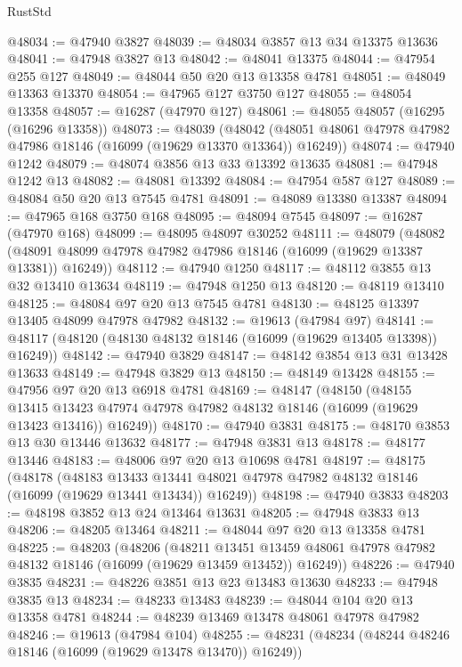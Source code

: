 \begin{lexlean}{RustStd}
\begin{coremodule}
@48034 := @47940 @3827
@48039 := @48034 @3857 @13 @34 @13375 @13636
@48041 := @47948 @3827 @13
@48042 := @48041 @13375
@48044 := @47954 @255 @127
@48049 := @48044 @50 @20 @13 @13358 @4781
@48051 := @48049 @13363 @13370
@48054 := @47965 @127 @3750 @127
@48055 := @48054 @13358
@48057 := @16287 (@47970 @127)
@48061 := @48055 @48057 (@16295 (@16296 @13358))
@48073 := @48039
    (@48042 (@48051 @48061 @47978 @47982 @47986 @18146 (@16099 (@19629 @13370 @13364)) @16249))
@48074 := @47940 @1242
@48079 := @48074 @3856 @13 @33 @13392 @13635
@48081 := @47948 @1242 @13
@48082 := @48081 @13392
@48084 := @47954 @587 @127
@48089 := @48084 @50 @20 @13 @7545 @4781
@48091 := @48089 @13380 @13387
@48094 := @47965 @168 @3750 @168
@48095 := @48094 @7545
@48097 := @16287 (@47970 @168)
@48099 := @48095 @48097 @30252
@48111 := @48079
    (@48082 (@48091 @48099 @47978 @47982 @47986 @18146 (@16099 (@19629 @13387 @13381)) @16249))
@48112 := @47940 @1250
@48117 := @48112 @3855 @13 @32 @13410 @13634
@48119 := @47948 @1250 @13
@48120 := @48119 @13410
@48125 := @48084 @97 @20 @13 @7545 @4781
@48130 := @48125 @13397 @13405 @48099 @47978 @47982
@48132 := @19613 (@47984 @97)
@48141 := @48117 (@48120 (@48130 @48132 @18146 (@16099 (@19629 @13405 @13398)) @16249))
@48142 := @47940 @3829
@48147 := @48142 @3854 @13 @31 @13428 @13633
@48149 := @47948 @3829 @13
@48150 := @48149 @13428
@48155 := @47956 @97 @20 @13 @6918 @4781
@48169 := @48147
    (@48150
      (@48155
        @13415
        @13423
        @47974
        @47978
        @47982
        @48132
        @18146
        (@16099 (@19629 @13423 @13416))
        @16249))
@48170 := @47940 @3831
@48175 := @48170 @3853 @13 @30 @13446 @13632
@48177 := @47948 @3831 @13
@48178 := @48177 @13446
@48183 := @48006 @97 @20 @13 @10698 @4781
@48197 := @48175
    (@48178
      (@48183
        @13433
        @13441
        @48021
        @47978
        @47982
        @48132
        @18146
        (@16099 (@19629 @13441 @13434))
        @16249))
@48198 := @47940 @3833
@48203 := @48198 @3852 @13 @24 @13464 @13631
@48205 := @47948 @3833 @13
@48206 := @48205 @13464
@48211 := @48044 @97 @20 @13 @13358 @4781
@48225 := @48203
    (@48206
      (@48211
        @13451
        @13459
        @48061
        @47978
        @47982
        @48132
        @18146
        (@16099 (@19629 @13459 @13452))
        @16249))
@48226 := @47940 @3835
@48231 := @48226 @3851 @13 @23 @13483 @13630
@48233 := @47948 @3835 @13
@48234 := @48233 @13483
@48239 := @48044 @104 @20 @13 @13358 @4781
@48244 := @48239 @13469 @13478 @48061 @47978 @47982
@48246 := @19613 (@47984 @104)
@48255 := @48231 (@48234 (@48244 @48246 @18146 (@16099 (@19629 @13478 @13470)) @16249))

\end{coremodule}
\end{lexlean}

